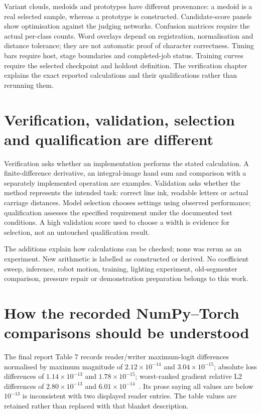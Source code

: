 Variant clouds, medoids and prototypes have different provenance: a medoid
is a real selected sample, whereas a prototype is constructed. Candidate-score
panels show optimisation against the judging networks. Confusion matrices
require the actual per-class counts. Word overlays depend on registration,
normalisation and distance tolerance; they are not automatic proof of
character correctness. Timing bars require host, stage boundaries and
completed-job status. Training curves require the selected checkpoint and
holdout definition. The verification chapter explains the exact reported
calculations and their qualifications rather than rerunning them.


\section{Verification, validation, selection and qualification are different}
Verification asks whether an implementation performs the stated calculation.
A finite-difference derivative, an integral-image hand sum and comparison with
a separately implemented operation are examples. Validation asks whether the
method represents the intended task: correct line ink, readable letters or
actual carriage distances. Model selection chooses settings using observed
performance; qualification assesses the specified requirement under the
documented test conditions. A high validation score used to choose a width
is evidence for selection, not an untouched qualification result.

The additions explain how calculations can be checked; none was rerun as an
experiment. New arithmetic is labelled as constructed or derived. No coefficient
sweep, inference, robot motion, training, lighting experiment, old-segmenter
comparison, pressure repair or demonstration preparation belongs to this work.

\section{How the recorded NumPy--Torch comparisons should be understood}
The final report Table 7 records reader/writer maximum-logit differences
normalised by maximum magnitude of $2.12\times10^{-14}$ and
$3.04\times10^{-15}$; absolute loss differences of $1.14\times10^{-13}$
and $1.78\times10^{-15}$; worst-ranked gradient relative L2 differences of
$2.80\times10^{-13}$ and $6.01\times10^{-14}$~\cite{finalreport2026}.
Its prose saying all values are below $10^{-13}$ is inconsistent with two
displayed reader entries. The table values are retained rather than replaced
with that blanket description.

